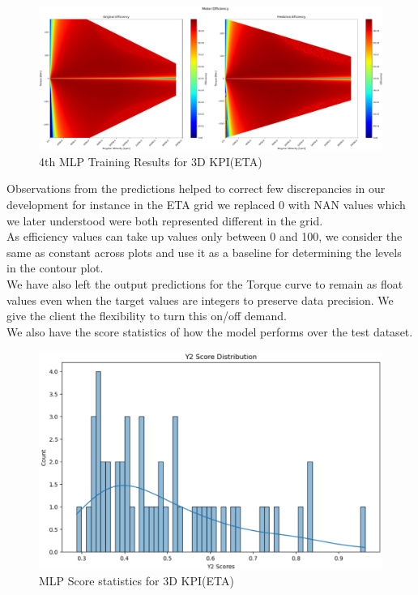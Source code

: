 \documentclass{report} %
\begin{document}
\begin{figure}[H]
    \centering
    \includegraphics[width=1\textwidth]{./ReportImages/KPI3Dprediction2.png} 
    \caption{4th MLP Training Results for 3D KPI(ETA)} 
    \label{fig:4th MLP Training Results for 3D KPI(ETA)}
\end{figure}


Observations from the predictions helped to correct few discrepancies in our development for instance in the ETA grid we replaced 0 with NAN values which we later understood were both represented different in the grid.\\
As efficiency values can take up values only between 0 and 100, we consider the same as constant across plots and use it as a baseline for determining the levels in the contour plot. \\ 
We have also left the output predictions for the Torque curve to remain as float values even when the target values are integers to preserve data precision. We give the client the flexibility to turn this on/off demand. \\
We also have the score statistics of how the model performs over the test dataset.\\

\begin{figure}[H]
    \centering
    \includegraphics[width=1\textwidth]{./ReportImages/score_mlp_y2.png} 
    \caption{MLP Score statistics for 3D KPI(ETA)} 
    \label{fig:MLP Score statistics for 3D KPI(ETA)}
\end{figure}
\end{document}
